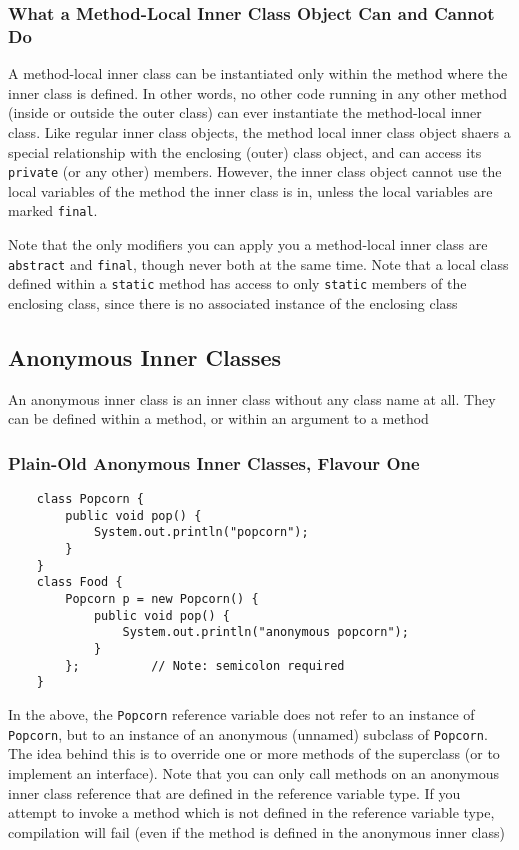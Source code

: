 \subsubsection{What a Method-Local Inner Class Object Can and Cannot Do}
A method-local inner class can be instantiated only within the method where the 
inner class is defined. In other words, no other code running in any other 
method (inside or outside the outer class) can ever instantiate the 
method-local inner class. Like regular inner class objects, the method local 
inner class object shaers a special relationship with the enclosing (outer) 
class object, and can access its \verb#private# (or any other) members.  
However, the inner class object cannot use the local variables of the method 
the inner class is in, unless the local variables are marked \verb#final#.

Note that the only modifiers you can apply you a method-local inner class are 
\verb#abstract# and \verb#final#, though never both at the same time. Note that 
a local class defined within a \verb#static# method has access to only 
\verb#static# members of the enclosing class, since there is no associated 
instance of the enclosing class

\subsection{Anonymous Inner Classes}
An anonymous inner class is an inner class without any class name at all. They 
can be defined within a method, or within an argument to a method

\subsubsection{Plain-Old Anonymous Inner Classes, Flavour One}
\begin{verbatim}
    class Popcorn {
        public void pop() {
            System.out.println("popcorn");
        }
    }
    class Food {
        Popcorn p = new Popcorn() {
            public void pop() {
                System.out.println("anonymous popcorn");
            }
        };          // Note: semicolon required
    }
\end{verbatim}
In the above, the \verb#Popcorn# reference variable does not refer to an 
instance of \verb#Popcorn#, but to an instance of an anonymous (unnamed) 
subclass of \verb#Popcorn#. The idea behind this is to override one or more 
methods of the superclass (or to implement an interface). Note that you can 
only call methods on an anonymous inner class reference that are defined in the 
reference variable type. If you attempt to invoke a method which is not defined 
in the reference variable type, compilation will fail (even if the method is 
defined in the anonymous inner class)

